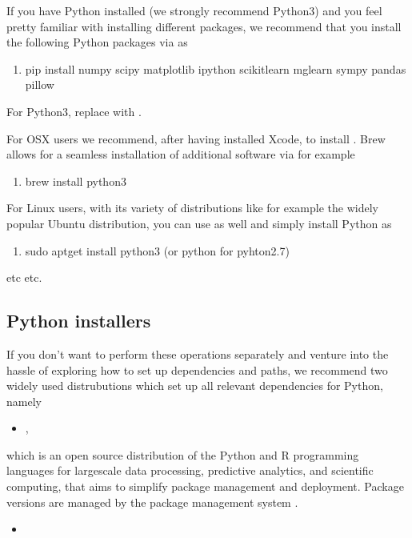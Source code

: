 \documentclass[letterpaper,10pt,english]{sphinxmanual}
\begin{document}
If you have Python installed (we strongly recommend Python3) and you feel
pretty familiar with installing different packages, we recommend that
you install the following Python packages via  as
\begin{enumerate}
%
\item {} 
pip install numpy scipy matplotlib ipython scikit\sphinxhyphen{}learn mglearn sympy pandas pillow

\end{enumerate}

For Python3, replace  with .

For OSX users we recommend, after having installed Xcode, to
install . Brew allows for a seamless installation of additional
software via for example
\begin{enumerate}
%
\item {} 
brew install python3

\end{enumerate}

For Linux users, with its variety of distributions like for example the widely popular Ubuntu distribution,
you can use  as well and simply install Python as
\begin{enumerate}
%
\item {} 
sudo apt\sphinxhyphen{}get install python3  (or python for pyhton2.7)

\end{enumerate}

etc etc.


\subsection{Python installers}
\label{\detokenize{chapter3:python-installers}}
If you don’t want to perform these operations separately and venture
into the hassle of exploring how to set up dependencies and paths, we
recommend two widely used distrubutions which set up all relevant
dependencies for Python, namely
\begin{itemize}
\item {} 
,

\end{itemize}

which is an open source
distribution of the Python and R programming languages for large\sphinxhyphen{}scale
data processing, predictive analytics, and scientific computing, that
aims to simplify package management and deployment. Package versions
are managed by the package management system .
\begin{itemize}
\item {} 

\end{itemize}
\end{document}
